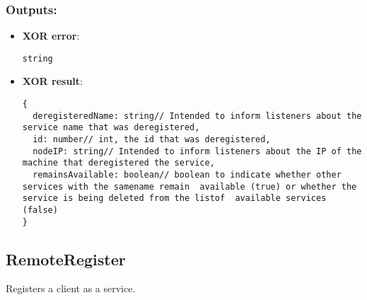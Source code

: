 \subsubsection*{Outputs:}
\begin{itemize}
  \small
    \item \textbf{XOR error}: 
\begin{lstlisting}
string
\end{lstlisting}
    \item \textbf{XOR result}: 
\begin{lstlisting}
{
  deregisteredName: string// Intended to inform listeners about the service name that was deregistered, 
  id: number// int, the id that was deregistered, 
  nodeIP: string// Intended to inform listeners about the IP of the machine that deregistered the service, 
  remainsAvailable: boolean// boolean to indicate whether other services with the samename remain  available (true) or whether the service is being deleted from the listof  available services (false)
}
\end{lstlisting}
  \end{itemize}

\subsection{RemoteRegister}
\label{ch:builtinservices:RemoteRegister}
Registers a client as a service.
